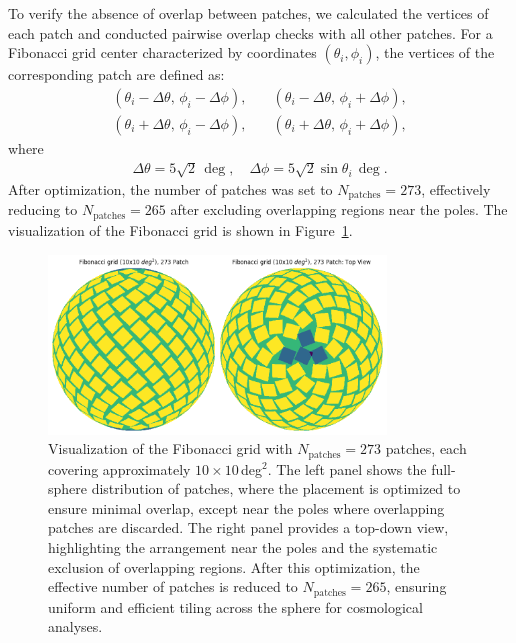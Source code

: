 To verify the absence of overlap between patches, we calculated the vertices of each patch and conducted pairwise overlap checks with all other patches. For a Fibonacci grid center characterized by coordinates \( (\theta_i, \phi_i) \), the vertices of the corresponding patch are defined as:
\begin{align}
    \left( \theta_i - \Delta \theta,\, \phi_i - \Delta \phi \right), \quad &\left( \theta_i - \Delta \theta,\, \phi_i + \Delta \phi \right), \nonumber \\
    \left( \theta_i + \Delta \theta,\, \phi_i - \Delta \phi \right), \quad &\left( \theta_i + \Delta \theta,\, \phi_i + \Delta \phi \right),
\end{align}
where
\begin{align}
    \Delta \theta = 5\sqrt{2}\, \mathrm{\deg}, \quad \Delta \phi = 5\sqrt{2}\sin \theta_i \, \mathrm{\deg}.
\end{align}
After optimization, the number of patches was set to $N_{\text{patches}} = 273$, effectively reducing to $N_{\text{patches}} = 265$ after excluding overlapping regions near the poles. The visualization of the Fibonacci grid is shown in Figure~\ref{fig:fibonacci}.
\begin{figure}[ht]
    \centering
    \includegraphics[width=0.8\textwidth]{figures/fibonacci_grid.png}
    \caption{Visualization of the Fibonacci grid with $N_{\text{patches}} = 273$ patches, each covering approximately $10 \times 10$\,deg$^2$. The left panel shows the full-sphere distribution of patches, where the placement is optimized to ensure minimal overlap, except near the poles where overlapping patches are discarded. The right panel provides a top-down view, highlighting the arrangement near the poles and the systematic exclusion of overlapping regions. After this optimization, the effective number of patches is reduced to $N_{\text{patches}} = 265$, ensuring uniform and efficient tiling across the sphere for cosmological analyses.}\label{fig:fibonacci}
\end{figure}

